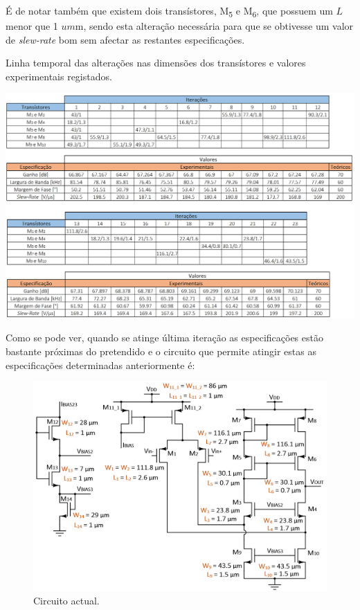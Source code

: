 \documentclass[11pt]{article}
\numberwithin{equation}{section}
\begin{document}
É de notar também que existem dois transístores, M\textsubscript{5} e M\textsubscript{6}, que possuem um $L$ menor que 1 $um$m, sendo esta alteração necessária para que se obtivesse um valor de \textit{slew-rate} bom sem afectar as restantes especificações.

\begin{table}[H]
	\centering
	\caption{Linha temporal das alterações nas dimensões dos transístores e valores experimentais registados.}
	\vspace{-1.5mm}
	\includegraphics[keepaspectratio=true, scale=0.40]{teoricas/tabelaF1}
\end{table}

Como se pode ver, quando se atinge última iteração as especificações estão bastante próximas do pretendido e o circuito que permite atingir estas as especificações determinadas anteriormente é:

\begin{figure}[H]
	\centering
	\includegraphics[keepaspectratio=true, scale=0.70]{teoricas/ajustesF1}
	\vspace{-0.5em}
	\caption{Circuito actual.}
	\vspace{-0.8em}
\end{figure}
\end{document}
